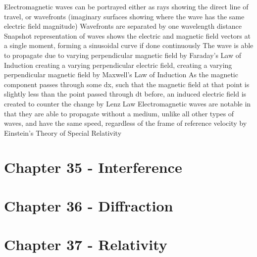 \documentclass[11 pt, twoside]{article}
\newenvironment{outline*}
{
	\begin{outline}[enumerate]
	}
	{\end{outline}
}
\begin{document}
\begin{outline*}
\1 Electromagnetic waves can be portrayed either as rays showing the direct line of travel, or wavefronts (imaginary surfaces showing where the wave has the same electric field magnitude)
\2 Wavefronts are separated by one wavelength distance
\2 Snapshot representation of waves shows the electric and magnetic field vectors at a single moment, forming a sinusoidal curve if done continuously
\1 The wave is able to propagate due to varying perpendicular magnetic field by Faraday's Law of  Induction creating a varying perpendicular electric field, creating a varying perpendicular magnetic field by Maxwell's Law of Induction
\2 As the magnetic component passes through some dx, such that the magnetic field at that point is slightly less than the point passed through dt before, an induced electric field is created to counter the change by Lenz Law
\2 
\1 Electromagnetic waves are notable in that they are able to propagate without a medium, unlike all other types of waves, and have the same speed, regardless of the frame of reference velocity by Einstein's Theory of Special Relativity
\end{outline*}
\section{Chapter 35 - Interference}
\begin{outline*}

\end{outline*}
\section{Chapter 36 - Diffraction}
\begin{outline*}

\end{outline*}
\section{Chapter 37 - Relativity}
\begin{outline*}

\end{outline*}
\end{document}
